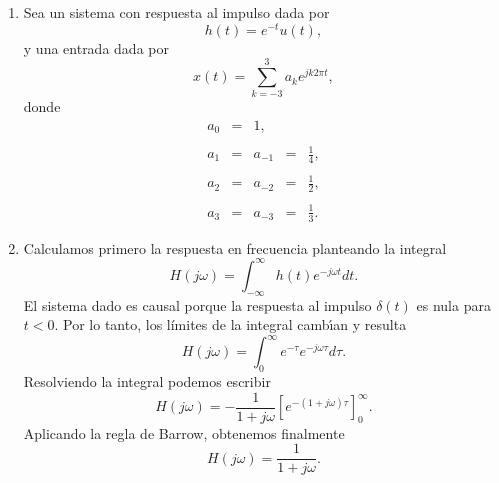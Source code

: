 \begin{enumerate}
\item Sea un sistema con respuesta al impulso dada por 
\begin{equation}
h\left( t\right) =e^{-t}u\left( t\right) ,
\end{equation}
y una entrada dada por 
\begin{equation}
x\left( t\right) =\sum_{k=-3}^{3}a_{k}e^{jk2\pi t},
\end{equation}
donde 
\begin{equation}
\begin{array}{ccccc}
a_{0} &=&1,&& \\
&&&& \\
a_{1} &=&a_{-1}&=&\frac{1}{4}, \\
&&&& \\
a_{2} &=&a_{-2}&=&\frac{1}{2}, \\
&&&& \\
a_{3} &=&a_{-3}&=&\frac{1}{3}.
\end{array}
\end{equation}

\item Calculamos primero la respuesta en frecuencia planteando la integral
\begin{equation}
H\left( j\omega \right) =
  \int_{-\infty }^{\infty }h\left( t\right)e^{-j\omega t}dt.
\end{equation}
El sistema dado es causal porque la respuesta al impulso $\delta(t)$ es nula para $t < 0$. Por lo
tanto, los l\'{i}mites de la integral camb\'{\i}an y resulta
\begin{equation}
H\left( j\omega \right) =
  \int_{0}^{\infty }e^{-\tau }e^{-j\omega \tau}d\tau.
\end{equation}
Resolviendo la integral podemos escribir
\begin{equation}
H\left( j\omega \right) =
  -\frac{1}{1+j\omega }\left[ e^{-\left( 1+j\omega\right) \tau }\right] _{0}^{\infty }.
\end{equation}
Aplicando la regla de Barrow, obtenemos finalmente
\begin{equation}
H\left( j\omega \right) =\frac{1}{1+j\omega }.
\end{equation}


\end{enumerate}
